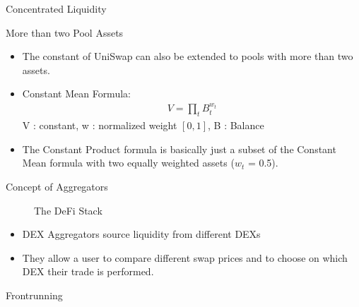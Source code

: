 \documentclass[]{beamer}
\begin{document}
\begin{frame}{Concentrated Liquidity}

\end{frame}


\begin{frame}{More than two Pool Assets}
\begin{itemize}
	\item The constant of UniSwap can also be extended to pools with more than two assets.
	\item Constant Mean Formula:
		\begin{align*}
			V = \prod_t B^{w_{t}}_{t}
		\end{align*}
	V : constant, w : normalized weight $[0,1]$, B : Balance
	\item The Constant Product formula is basically just a subset of the Constant Mean formula with two equally weighted assets ($w_t$ = 0.5).
\end{itemize}

\end{frame}


\begin{frame}{Concept of Aggregators}

\begin{figure}[t]
	\centering	
	\resizebox{0.8\textwidth}{!}{
	\begin{tikzpicture}[scale=1.0, every node/.style={scale=1.0}]
			
	\end{tikzpicture}}
	\caption{The DeFi Stack \cite{FS:21}}
\end{figure}
\vspace{-1em}
\begin{itemize}
	\item DEX Aggregators source liquidity from different DEXs
	\item They allow a user to compare different swap prices and to choose on which DEX their trade is performed.
\end{itemize}


\end{frame}


\begin{frame}{Frontrunning}

\end{frame}
\end{document}
